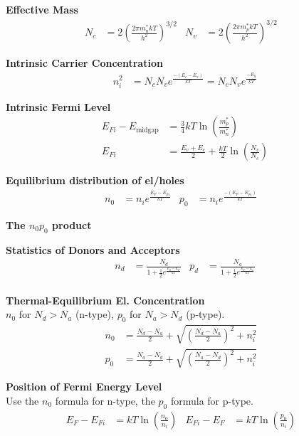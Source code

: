 \documentclass[a4paper, fontsize=8pt, landscape, DIV=1]{scrartcl}
\begin{document}
\begin{multicols*}{4}
    \textbf{Effective Mass} \\
      \begin{align*}
        N_c &= 2\left(\frac{2\pi m_n^*kT}{h^2}\right)^{3/2} &
        N_v &= 2\left(\frac{2\pi m_p^*kT}{h^2}\right)^{3/2} &
      \end{align*}

    \textbf{Intrinsic Carrier Concentration} \\
      \begin{align*}
        n_i^2 &= N_cN_ve^{\frac{-(E_c-E_v)}{kT}} = N_cN_ve^{\frac{-E_g}{kT}}
      \end{align*}

    \textbf{Intrinsic Fermi Level} \\
      \begin{align*}
        E_{Fi} - E_{\text{midgap}} &= \frac{3}{4}kT\ln\left(\frac{m_p^*}{m_n^*}\right) \\
        E_{Fi} &= \frac{E_v+E_c}{2} + \frac{kT}{2}\ln\left(\frac{N_v}{N_c}\right)
      \end{align*}

    \textbf{Equilibrium distribution of el/holes} \\
      \begin{align*}
        n_0 &= n_i e^{\frac{E_F-E_{Fi}}{kT}} &
        p_0 &= n_i e^{\frac{-(E_F-E_{Fi})}{kT}} &
      \end{align*}

    \textbf{The $n_0p_0$ product} \\

    \textbf{Statistics of Donors and Acceptors} \\
      \begin{align*}
        n_d &= \frac{N_d}{1+\frac{1}{2}e^{\frac{E_d-E_F}{kT}}} &
        p_d &= \frac{N_a}{1+\frac{1}{2}e^{\frac{E_F-E_a}{kT}}} \\
      \end{align*}

    \textbf{Thermal-Equilibrium El. Concentration} \\
    $n_0$ for $N_d>N_a$ (n-type), $p_0$ for $N_a>N_d$ (p-type).
      \begin{align*}
        n_0 & = \frac{N_d-N_a}{2}+\sqrt{\left(\frac{N_d-N_a}{2}\right)^2+n_i^2} \\
        p_0 & = \frac{N_a-N_d}{2}+\sqrt{\left(\frac{N_a-N_d}{2}\right)^2+n_i^2} &
      \end{align*}
 
    \textbf{Position of Fermi Energy Level} \\
    Use the $n_0$ formula for n-type, the $p_0$ formula for p-type.
      \begin{align*}
        E_F-E_{Fi} &= kT\ln\left(\frac{n_0}{n_i}\right) &
        E_{Fi}-E_{F} &= kT\ln\left(\frac{p_0}{n_i}\right) &
      \end{align*}


\end{multicols*}
\end{document}
